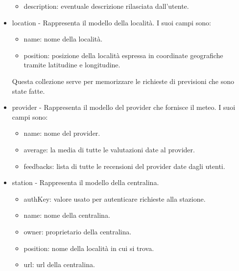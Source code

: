 \begin{itemize}
\begin{itemize}
    \item description: eventuale descrizione rilasciata dall'utente. 
\end{itemize}
\item location - Rappresenta il modello della località. I suoi campi sono:
\begin{itemize}
    \item name: nome della località.
    \item position: posizione della località espressa in coordinate geografiche tramite latitudine e longitudine.
\end{itemize}
Questa collezione serve per memorizzare le richieste di previsioni che sono state fatte.
\item provider - Rappresenta il modello del provider che fornisce il meteo. I suoi campi sono:
\begin{itemize}
    \item name: nome del provider.
    \item average: la media di tutte le valutazioni date al provider.
    \item feedbacks: lista di tutte le recensioni del provider date dagli utenti.
\end{itemize}
\item station - Rappresenta  il modello della centralina.
\begin{itemize}
    \item authKey: valore usato per autenticare richieste alla stazione.
    \item name: nome della centralina.
    \item owner: proprietario della centralina.
    \item position: nome della località in cui si trova.
    \item url: url della centralina.
\end{itemize}
\end{itemize}
